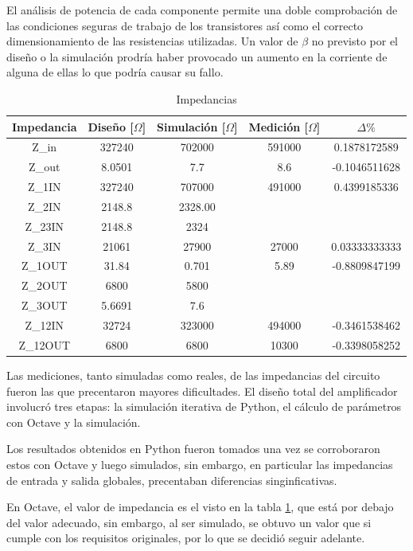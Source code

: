 El análisis de potencia de cada componente permite una doble comprobación de las condiciones seguras de trabajo de los transistores así como el correcto dimensionamiento de las resistencias utilizadas. Un valor de $\beta$ no previsto por el diseño o la simulación prodría haber provocado un aumento en la corriente de alguna de ellas lo que podría causar su fallo.

\begin{table}[H]
\centering
\begin{tabular}{|c|c|c|c|c|}
\hline
\textbf{Impedancia} & \textbf{Diseño [$\Omega$]} & \textbf{Simulación [$\Omega$]} & \textbf{Medición [$\Omega$]} & $\Delta \%$ \\ \hline
Z_{in} & 327240 & 702000 & 591000 & 0.1878172589 \\ \hline
Z_{out} & 8.0501 & 7.7 & 8.6 & -0.1046511628 \\ \hline
Z_{1IN} & 327240 & 707000 & 491000 & 0.4399185336 \\ \hline
Z_{2IN} & 2148.8 & 2328.00 & & \\ \hline
Z_{23IN} & 2148.8 & 2324 & & \\ \hline
Z_{3IN} & 21061 & 27900 & 27000 & 0.03333333333 \\ \hline
Z_{1OUT} & 31.84 & 0.701 & 5.89 & -0.8809847199 \\ \hline
Z_{2OUT} & 6800 & 5800 & & \\ \hline
Z_{3OUT} & 5.6691 & 7.6 & & \\ \hline
Z_{12IN} & 32724 & 323000 & 494000 & -0.3461538462 \\ \hline
Z_{12OUT} & 6800 & 6800 & 10300 & -0.3398058252 \\ \hline
\end{tabular}
\caption{Impedancias}
\label{tab:impedancias}
\end{table}

Las mediciones, tanto simuladas como reales, de las impedancias del circuito fueron las que precentaron mayores dificultades. El diseño total del amplificador involucró tres etapas: la simulación iterativa de Python, el cálculo de parámetros con Octave y la simulación.

Los resultados obtenidos en Python fueron tomados una vez se corroboraron estos con Octave y luego simulados, sin embargo, en particular las impedancias de entrada y salida globales, precentaban diferencias singinficativas. 

En Octave, el valor de impedancia es el visto en la tabla \ref{tab:impedancias}, que está por debajo del valor adecuado, sin embargo, al ser simulado, se obtuvo un valor que si cumple con los requisitos originales, por lo que se decidió seguir adelante.

